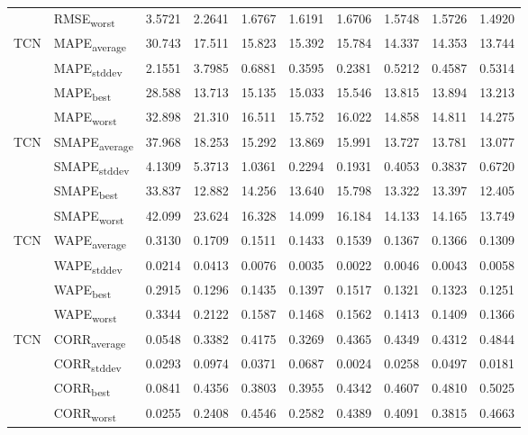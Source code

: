 {\begin{longtable}{l l c c c c c c c c}
 & RMSE\textsubscript{worst} & 3.5721 & 2.2641 & 1.6767 & 1.6191 & 1.6706 & 1.5748 & 1.5726 & 1.4920 \\
\cmidrule(lr){2-10}
\multirow{4}{*}{TCN} & MAPE\textsubscript{average} & 30.743 & 17.511 & 15.823 & 15.392 & 15.784 & 14.337 & 14.353 & 13.744 \\
 & MAPE\textsubscript{stddev} & 2.1551 & 3.7985 & 0.6881 & 0.3595 & 0.2381 & 0.5212 & 0.4587 & 0.5314 \\
 & MAPE\textsubscript{best} & 28.588 & 13.713 & 15.135 & 15.033 & 15.546 & 13.815 & 13.894 & 13.213 \\
 & MAPE\textsubscript{worst} & 32.898 & 21.310 & 16.511 & 15.752 & 16.022 & 14.858 & 14.811 & 14.275 \\
\cmidrule(lr){2-10}
\multirow{4}{*}{TCN} & SMAPE\textsubscript{average} & 37.968 & 18.253 & 15.292 & 13.869 & 15.991 & 13.727 & 13.781 & 13.077 \\
 & SMAPE\textsubscript{stddev} & 4.1309 & 5.3713 & 1.0361 & 0.2294 & 0.1931 & 0.4053 & 0.3837 & 0.6720 \\
 & SMAPE\textsubscript{best} & 33.837 & 12.882 & 14.256 & 13.640 & 15.798 & 13.322 & 13.397 & 12.405 \\
 & SMAPE\textsubscript{worst} & 42.099 & 23.624 & 16.328 & 14.099 & 16.184 & 14.133 & 14.165 & 13.749 \\
\cmidrule(lr){2-10}
\multirow{4}{*}{TCN} & WAPE\textsubscript{average} & 0.3130 & 0.1709 & 0.1511 & 0.1433 & 0.1539 & 0.1367 & 0.1366 & 0.1309 \\
 & WAPE\textsubscript{stddev} & 0.0214 & 0.0413 & 0.0076 & 0.0035 & 0.0022 & 0.0046 & 0.0043 & 0.0058 \\
 & WAPE\textsubscript{best} & 0.2915 & 0.1296 & 0.1435 & 0.1397 & 0.1517 & 0.1321 & 0.1323 & 0.1251 \\
 & WAPE\textsubscript{worst} & 0.3344 & 0.2122 & 0.1587 & 0.1468 & 0.1562 & 0.1413 & 0.1409 & 0.1366 \\
\cmidrule(lr){2-10}
\multirow{4}{*}{TCN} & CORR\textsubscript{average} & 0.0548 & 0.3382 & 0.4175 & 0.3269 & 0.4365 & 0.4349 & 0.4312 & 0.4844 \\
 & CORR\textsubscript{stddev} & 0.0293 & 0.0974 & 0.0371 & 0.0687 & 0.0024 & 0.0258 & 0.0497 & 0.0181 \\
 & CORR\textsubscript{best} & 0.0841 & 0.4356 & 0.3803 & 0.3955 & 0.4342 & 0.4607 & 0.4810 & 0.5025 \\
 & CORR\textsubscript{worst} & 0.0255 & 0.2408 & 0.4546 & 0.2582 & 0.4389 & 0.4091 & 0.3815 & 0.4663 \\

\end{longtable}}
